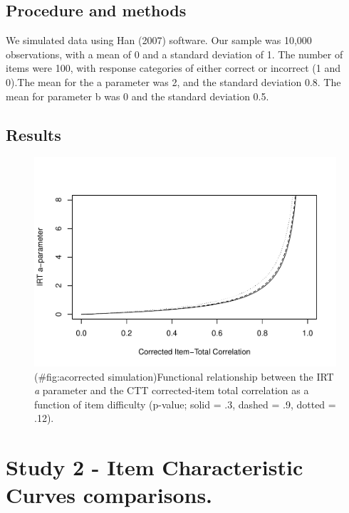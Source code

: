 \documentclass[
  english,
  man]{apa6}
\begin{document}
\hypertarget{procedure-and-methods}{%
\subsection{Procedure and methods}\label{procedure-and-methods}}

We simulated data using Han (2007) software. Our sample was 10,000 observations, with a mean of 0 and a standard deviation of 1. The number of items were 100, with response categories of either correct or incorrect (1 and 0).The mean for the a parameter was 2, and the standard deviation 0.8. The mean for parameter b was 0 and the standard deviation 0.5.

\hypertarget{results}{%
\subsection{Results}\label{results}}

\begin{figure}
\centering
\includegraphics{ICC_project_files/figure-latex/acorrected simulation-1.pdf}
\caption{(\#fig:acorrected simulation)Functional relationship between the IRT \emph{a} parameter and the CTT corrected-item total correlation as a function of item difficulty (p-value; solid = .3, dashed = .9, dotted = .12).}
\end{figure}

\hypertarget{study-2---item-characteristic-curves-comparisons.}{%
\section{Study 2 - Item Characteristic Curves comparisons.}\label{study-2---item-characteristic-curves-comparisons.}}
\end{document}
